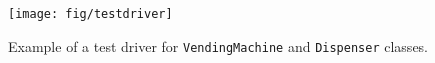 \begin{figure}[!ht]
\begin{center}
\texttt{[image: fig/testdriver]}
\caption{\label{fig:drv}Example of a test driver for
\texttt{VendingMachine} and \texttt{Dispenser} classes.}
\end{center}
\end{figure}

